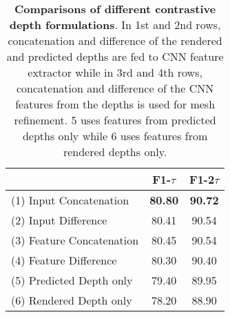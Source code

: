 \begin{table}[ht]
\begin{center}
\footnotesize
\begin{tabular}{ l c c }
\toprule[1pt]
 &F1-$\tau$ &F1-2$\tau$ \\ \hline
(1) Input Concatenation \qquad \qquad  \qquad  \qquad  \qquad  & \textbf{80.80} & \textbf{90.72} \\
(2) Input Difference & 80.41 & 90.54 \\
(3) Feature Concatenation   & 80.45 & 90.54 \\
(4) Feature Difference & 80.30 & 90.40 \\
(5) Predicted Depth only & 79.40 & 89.95 \\
(6) Rendered Depth only & 78.20 & 88.90 \\
\bottomrule[1pt]
\end{tabular}
\end{center}
\vspace{-4mm}
\caption{\textbf{Comparisons of different contrastive depth formulations}. In 1st and 2nd rows, concatenation and difference of the rendered and predicted depths are fed to CNN feature extractor while in 3rd and 4th rows, concatenation and difference of the CNN features from the depths is used for mesh refinement. 5 uses features from predicted depths only while 6 uses features from rendered depths only.}
\label{table:contrastive_feature_extraction}
\end{table}


